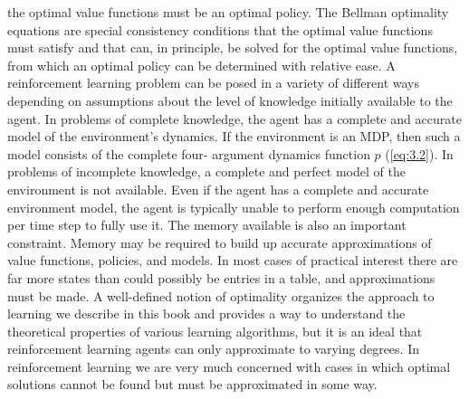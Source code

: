 the optimal value functions must be an optimal policy. The Bellman optimality equations
are special consistency conditions that the optimal value functions must satisfy and that
can, in principle, be solved for the optimal value functions, from which an optimal policy
can be determined with relative ease.
A reinforcement learning problem can be posed in a variety of different ways depending
on assumptions about the level of knowledge initially available to the agent. In problems
of complete knowledge, the agent has a complete and accurate model of the environment’s
dynamics. If the environment is an MDP, then such a model consists of the complete four-
argument dynamics function $p$ (\ref{eq:3.2}).
In problems of incomplete knowledge, a complete
and perfect model of the environment is not available.
Even if the agent has a complete and accurate environment model, the agent is
typically unable to perform enough computation per time step to fully use it. The
memory available is also an important constraint. Memory may be required to build
up accurate approximations of value functions, policies, and models. In most cases of
practical interest there are far more states than could possibly be entries in a table, and
approximations must be made.
A well-defined notion of optimality organizes the approach to learning we describe in
this book and provides a way to understand the theoretical properties of various learning
algorithms, but it is an ideal that reinforcement learning agents can only approximate
to varying degrees. In reinforcement learning we are very much concerned with cases in
which optimal solutions cannot be found but must be approximated in some way.
